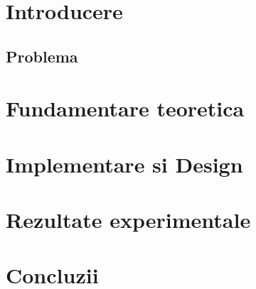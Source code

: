 \documentclass[10pt,a4paper]{article}
\begin{document}


\tableofcontents

\clearpage

\section{Introducere}
\subsection{Problema}
\paragraph{}
\clearpage

\section{Fundamentare teoretica}
\clearpage

\section{Implementare si Design}
\clearpage

\section{Rezultate experimentale}
\clearpage

\section{Concluzii}
\clearpage


\end{document}
